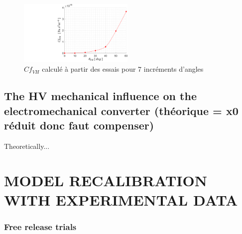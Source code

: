 \documentclass[3p,twocolumn,preprint]{elsarticle}
\begin{document}
\begin{figure}[!htbp]
\begin{center}
	\captionsetup{justification=centering}
	\includegraphics[trim={10cm 0cm 0cm 0cm},clip,width=0.49\textwidth]{figures/resultats_essais_hydraulique_VH_D1mm.pdf}
	\caption{$Cf_{VH}$ calculé à partir des essais pour 7 incréments d'angles}
	\label{fig:resultats_essais_hydraulique_VH_D1mm}
\end{center}
\end{figure}
	\subsection{The HV mechanical influence on the electromechanical converter (théorique = x0 réduit donc faut compenser)}	
	\label{The mechanical influence of the valve on the electromechanical converter}
Theoretically...

\section{MODEL RECALIBRATION WITH EXPERIMENTAL DATA}
\label{sec:MODEL RECALIBRATION WITH EXPERIMENTAL DATA}
	\subsubsection{Free release trials}
\end{document}
